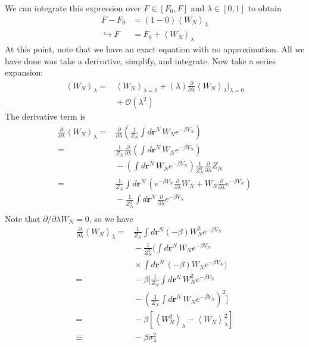 \documentclass[letterpaper,twocolumn,amsmath,amssymb,prb]{revtex4-1}
\newcommand{\rr}{\ensuremath{\mathbf{r}}}
\newcommand{\1}{\ensuremath{\textbf{r}_1}}
\newcommand{\2}{\ensuremath{\textbf{r}_2}}
\newcommand{\3}{\ensuremath{\textbf{r}_3}}
\newcommand{\4}{\ensuremath{\textbf{r}_4}}
\begin{document}
We can integrate this expression over $F\in[F_0,F]$ and $\lambda\in[0,1]$ to obtain
\begin{align}
  F - F_0 &= (1-0)\left\langle W_N \right\rangle_\lambda \nonumber \\
  \hookrightarrow F &= F_0 + \left\langle W_N \right\rangle_\lambda \label{eqn:F-inTermsW}
\end{align}
At this point, note that we have an exact equation with no approximation. All we have done was take a derivative, simplify, and integrate. Now take a series expansion:
\begin{align}
  \left\langle W_N \right\rangle_\lambda = &{} \left\langle W_N\right\rangle_{\lambda = 0} + (\lambda)\frac{\partial}{\partial\lambda}\left\langle W_N \right\rangle_{\lambda}\bigg|_{\lambda = 0} \nonumber\\
  &{} + \mathcal{O}(\lambda^2) \label{eqn:Wn-expansion}
\end{align}
The derivative term is
\begin{align}
  \frac{\partial}{\partial\lambda}\left\langle W_N \right\rangle_{\lambda} =&{} \frac{\partial}{\partial\lambda}\left( \frac{1}{Z_N}\int d\rr^N\, W_N e^{-\beta V_N}\right) \\
  =&{} \frac{1}{Z_N}\frac{\partial}{\partial\lambda}\left( \int d\rr^N\, W_N e^{-\beta V_N} \right) \nonumber\\
  &{} - \left( \int d\rr^N\, W_N e^{-\beta V_N} \right)\frac{1}{Z_N^2}\frac{\partial}{\partial\lambda}Z_N \\
  =&{} \frac{1}{Z_N}\int d\rr^N\, \left( e^{-\beta V_N}\frac{\partial}{\partial\lambda}W_N + W_N\frac{\partial}{\partial\lambda}e^{-\beta V_N} \right) \nonumber \\
  &{} - \frac{1}{Z_N^2}\int d\rr^N\, \frac{\partial}{\partial\lambda}e^{-\beta V_N} \\
\end{align}
Note that $\partial/\partial\lambda W_N = 0$, so we have
\begin{align}
   \frac{\partial}{\partial\lambda}\left\langle W_N \right\rangle_{\lambda} =&{} \frac{1}{Z_N}\int d\rr^N (-\beta) W_N^2 e^{-\beta V_N} \nonumber\\
   &{} - \frac{1}{Z_N^2}\Bigg(\int d\rr^N\, W_N e^{-\beta V_N} \nonumber\\
   &{} \times \int d\rr^N\, (-\beta)W_Ne^{-\beta V_N}\Bigg) \\
   =&{} -\beta\Bigg[ \frac{1}{Z_N}\int d\rr^N\, W_N^2e^{-\beta V_N}  \nonumber\\
   &{} - \left( \frac{1}{Z_N}\int d\rr^N\, W_N e^{-\beta V_N} \right)^2 \Bigg] \\
   =&{} -\beta\left[ \left\langle W_N^2 \right\rangle_\lambda - \left\langle W_N \right\rangle_\lambda^2 \right] \\
   \equiv &{} -\beta\sigma_\lambda^2
\end{align}
\end{document}
